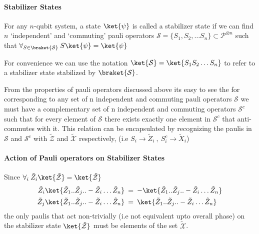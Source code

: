 \documentclass[
]{article}
\begin{document}
\hypertarget{stabilizer-states}{%
\paragraph{Stabilizer States}\label{stabilizer-states}}

For any \(n\)-qubit system, a state \(\ket{\psi}\) is called a
stabilizer state if we can find \(n\) `independent' and `commuting'
pauli operators
\(\mathcal{S} = \{S_{1}, S_{2}, \dots S_{n}\} \subset \mathcal{P}^{\otimes n}\)
such that
\(\forall_{S \in \braket{\mathcal{S}}} \: S \ket{\psi} = \ket{\psi}\)

For convenience we can use the notation
\(\ket{\mathcal{S}} = \ket{S_{1}S_{2} \dots S_n}\) to refer to a
stabilizer state stabilized by \(\braket{\mathcal{S}}\).

From the properties of pauli operators discussed above its easy to see
the for corresponding to any set of n independent and commuting pauli
operators \(\mathcal{S}\) we must have a complementary set of n
independent and commuting operators \(\mathcal{S}^c\) such that for
every element of \(\mathcal{S}\) there exists exactly one element in
\(\mathcal{S}^c\) that anti-commutes with it. This relation can be
encapsulated by recognizing the paulis in \(\mathcal{S}\) and
\(\mathcal{S}^{c}\) with \(\mathcal{\tilde{Z}}\) and
\(\mathcal{\tilde{X}}\) respectively, (i.e
\(S_{i}\to \tilde{Z}_{i}\:, \: S^{c}_{i} \to \tilde{X}_{i}\))

\hypertarget{action-of-pauli-operators-on-stabilizer-states}{%
\paragraph{Action of Pauli operators on Stabilizer
States}\label{action-of-pauli-operators-on-stabilizer-states}}

Since
\(\forall_{i} \: \tilde{Z}_{i} \ket{\tilde{\mathcal{Z}}} = \ket{\tilde{\mathcal{Z}}}\)
\[\begin{align} \tilde{Z}_{i}  \ket{\tilde{Z}_{1}.. \tilde{Z}_{j} .. -\tilde{Z}_{i}\dots \tilde{Z}_{n}}  \: &= \: -\ket{\tilde{Z}_{1}.. \tilde{Z}_{j}..-\tilde{Z}_{i}\dots \tilde{Z}_{n}}  \\ \tilde{Z}_{j}  \ket{\tilde{Z}_{1}.. \tilde{Z}_{j} .. -\tilde{Z}_{i}\dots \tilde{Z}_{n}}  \: &= \: \ket{\tilde{Z}_{1}.. \tilde{Z}_{j}..-\tilde{Z}_{i}\dots \tilde{Z}_{n}} \end{align}\]
the only paulis that act non-trivially (i.e not equivalent upto overall
phase) on the stabilizer state \(\ket{\mathcal{\tilde{Z}}}\) must be
elements of the set \(\mathcal{\tilde{X}}\).
\end{document}
